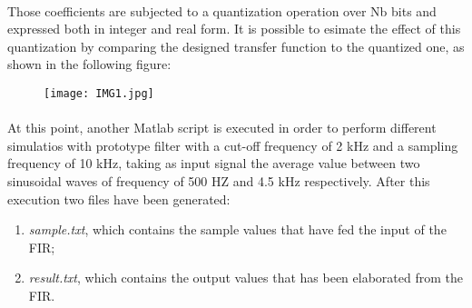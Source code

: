 \paragraph{}
Those coefficients are subjected to a quantization operation over Nb bits and expressed both in integer and real form.
It is possible to esimate the effect of this quantization by comparing the designed transfer function to the quantized one, as shown in the following figure: %
\begin{figure}[!ht]
	\texttt{[image: IMG1.jpg]}
	\centering
\end{figure}

\paragraph{}
At this point, another Matlab script is executed in order to perform
different simulatios with prototype filter with a cut-off frequency of 2 kHz and a sampling frequency of 10 kHz, taking as 
input signal the average value between two sinusoidal waves of frequency of 500 HZ and 4.5 kHz respectively.
After this execution two files have been generated:

\begin{enumerate}
	\item \emph{sample.txt}, which contains the sample values that have fed the input of the FIR;
	\item \emph{result.txt}, which contains the output values that has been elaborated from the FIR.
\end{enumerate}

